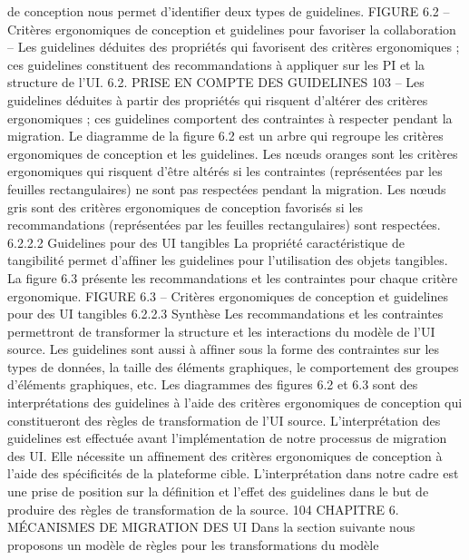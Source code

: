 \documentclass{article}
\begin{document}
de conception nous permet d’identiﬁer deux types de guidelines.
FIGURE 6.2 – Crit\`{e}res ergonomiques de conception et guidelines pour favoriser la collaboration
– Les guidelines d\'{e}duites des propri\'{e}t\'{e}s qui favorisent des crit\`{e}res ergonomiques ; ces guidelines
constituent des recommandations \`{a} appliquer sur les PI et la structure de l’UI.
6.2. PRISE EN COMPTE DES GUIDELINES
103
– Les guidelines d\'{e}duites \`{a} partir des propri\'{e}t\'{e}s qui risquent d’alt\'{e}rer des crit\`{e}res ergonomiques ; ces guidelines comportent des contraintes \`{a} respecter pendant la migration.
Le diagramme de la ﬁgure 6.2 est un arbre qui regroupe les crit\`{e}res ergonomiques de conception et les guidelines. Les nœuds oranges sont les crit\`{e}res ergonomiques qui risquent d’\^{e}tre alt\'{e}r\'{e}s si
les contraintes (repr\'{e}sent\'{e}es par les feuilles rectangulaires) ne sont pas respect\'{e}es pendant la migration. Les nœuds gris sont des crit\`{e}res ergonomiques de conception favoris\'{e}s si les recommandations
(repr\'{e}sent\'{e}es par les feuilles rectangulaires) sont respect\'{e}es.
6.2.2.2
Guidelines pour des UI tangibles
La propri\'{e}t\'{e} caract\'{e}ristique de tangibilit\'{e} permet d’afﬁner les guidelines pour l’utilisation des
objets tangibles. La ﬁgure 6.3 pr\'{e}sente les recommandations et les contraintes pour chaque crit\`{e}re
ergonomique.
FIGURE 6.3 – Crit\`{e}res ergonomiques de conception et guidelines pour des UI tangibles
6.2.2.3
Synth\`{e}se
Les recommandations et les contraintes permettront de transformer la structure et les interactions
du mod\`{e}le de l’UI source.
Les guidelines sont aussi \`{a} afﬁner sous la forme des contraintes sur les types de donn\'{e}es, la taille
des \'{e}l\'{e}ments graphiques, le comportement des groupes d’\'{e}l\'{e}ments graphiques, etc.
Les diagrammes des ﬁgures 6.2 et 6.3 sont des interpr\'{e}tations des guidelines \`{a} l’aide des crit\`{e}res
ergonomiques de conception qui constitueront des r\`{e}gles de transformation de l’UI source.
L’interpr\'{e}tation des guidelines est effectu\'{e}e avant l’impl\'{e}mentation de notre processus de migration des UI. Elle n\'{e}cessite un afﬁnement des crit\`{e}res ergonomiques de conception \`{a} l’aide des
sp\'{e}ciﬁcit\'{e}s de la plateforme cible. L’interpr\'{e}tation dans notre cadre est une prise de position sur la
d\'{e}ﬁnition et l’effet des guidelines dans le but de produire des r\`{e}gles de transformation de la source.
104
CHAPITRE 6. MÉCANISMES DE MIGRATION DES UI
Dans la section suivante nous proposons un mod\`{e}le de r\`{e}gles pour les transformations du mod\`{e}le
\end{document}
